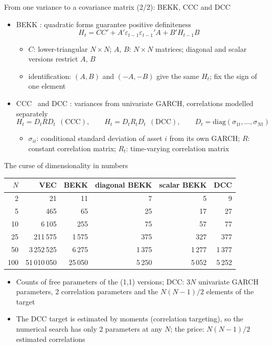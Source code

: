 \begin{frame}{From one variance to a covariance matrix (2/2): BEKK, CCC and DCC}
\itemsize{\small}
\begin{itemize}
    \item BEKK : quadratic forms guarantee positive definiteness
    \[ H_t = CC' + A'\varepsilon_{t-1}\varepsilon_{t-1}'A + B'H_{t-1}B \]
    \begin{itemize}
        \item $C$: lower-triangular $N \times N$; $A$, $B$: $N \times N$ matrices; diagonal and scalar versions restrict $A$, $B$
        \item identification: $(A, B)$ and $(-A, -B)$ give the same $H_t$; fix the sign of one element
    \end{itemize}
    \item CCC \ and DCC : variances from univariate GARCH, correlations modelled separately
    \[ H_t = D_tRD_t\ \ (\text{CCC}), \qquad H_t = D_tR_tD_t\ \ (\text{DCC}), \qquad D_t = \mathrm{diag}(\sigma_{1t}, \dots, \sigma_{Nt}) \]
    \begin{itemize}
        \item $\sigma_{it}$: conditional standard deviation of asset $i$ from its own GARCH; $R$: constant correlation matrix; $R_t$: time-varying correlation matrix
    \end{itemize}
\end{itemize}
\end{frame}

\begin{frame}{The curse of dimensionality in numbers}
\itemsize{\small}
\begin{center}
\footnotesize
\begin{tabular}{rrrrrr}
\toprule
$N$ & VEC & BEKK & diagonal BEKK & scalar BEKK & DCC \\
\midrule
2 & 21 & 11 & 7 & 5 & 9 \\
5 & 465 & 65 & 25 & 17 & 27 \\
10 & 6\,105 & 255 & 75 & 57 & 77 \\
25 & 211\,575 & 1\,575 & 375 & 327 & 377 \\
50 & 3\,252\,525 & 6\,275 & 1\,375 & 1\,277 & 1\,377 \\
100 & 51\,010\,050 & 25\,050 & 5\,250 & 5\,052 & 5\,252 \\
\bottomrule
\end{tabular}
\end{center}
\begin{itemize}
    \item Counts of free parameters of the (1,1) versions; DCC: $3N$ univariate GARCH parameters, 2 correlation parameters and the $N(N-1)/2$ elements of the target
    \item The DCC target is estimated by moments (correlation targeting), so the numerical search has only 2 parameters at any $N$; the price: $N(N-1)/2$ estimated correlations
\end{itemize}
\end{frame}

